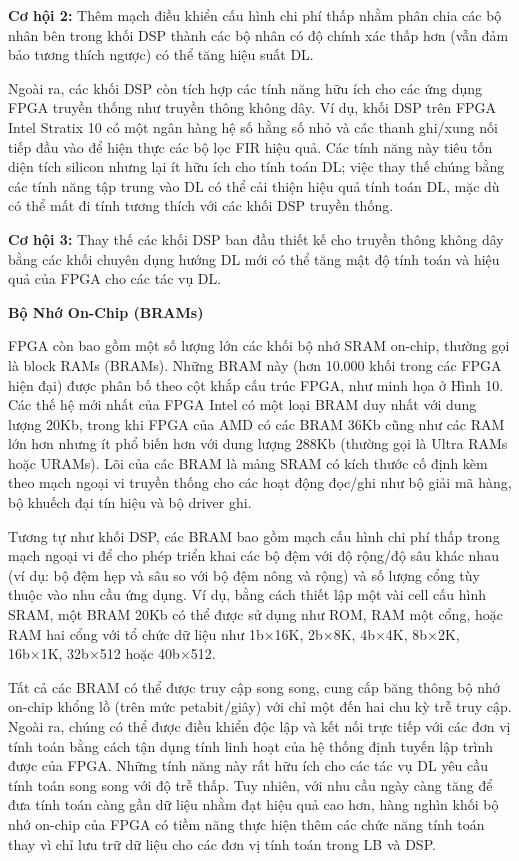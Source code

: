 \documentclass[a4paper]{article}
\begin{document}
\textbf{Cơ hội 2:} Thêm mạch điều khiển cấu hình chi phí thấp nhằm phân chia các bộ nhân bên trong khối DSP thành các bộ nhân có độ chính xác thấp hơn (vẫn đảm bảo tương thích ngược) có thể tăng hiệu suất DL.

Ngoài ra, các khối DSP còn tích hợp các tính năng hữu ích cho các ứng dụng FPGA truyền thống như truyền thông không dây. Ví dụ, khối DSP trên FPGA Intel Stratix 10 có một ngân hàng hệ số hằng số nhỏ và các thanh ghi/xung nối tiếp đầu vào để hiện thực các bộ lọc FIR hiệu quả. Các tính năng này tiêu tốn diện tích silicon nhưng lại ít hữu ích cho tính toán DL; việc thay thế chúng bằng các tính năng tập trung vào DL có thể cải thiện hiệu quả tính toán DL, mặc dù có thể mất đi tính tương thích với các khối DSP truyền thống.

\textbf{Cơ hội 3:} Thay thế các khối DSP ban đầu thiết kế cho truyền thông không dây bằng các khối chuyên dụng hướng DL mới có thể tăng mật độ tính toán và hiệu quả của FPGA cho các tác vụ DL.

\textbf{Bộ Nhớ On-Chip (BRAMs)}

FPGA còn bao gồm một số lượng lớn các khối bộ nhớ SRAM on-chip, thường gọi là block RAMs (BRAMs). Những BRAM này (hơn 10.000 khối trong các FPGA hiện đại) được phân bố theo cột khắp cấu trúc FPGA, như minh họa ở Hình 10. Các thế hệ mới nhất của FPGA Intel có một loại BRAM duy nhất với dung lượng 20Kb, trong khi FPGA của AMD có các BRAM 36Kb cũng như các RAM lớn hơn nhưng ít phổ biến hơn với dung lượng 288Kb (thường gọi là Ultra RAMs hoặc URAMs). Lõi của các BRAM là mảng SRAM có kích thước cố định kèm theo mạch ngoại vi truyền thống cho các hoạt động đọc/ghi như bộ giải mã hàng, bộ khuếch đại tín hiệu và bộ driver ghi.

Tương tự như khối DSP, các BRAM bao gồm mạch cấu hình chi phí thấp trong mạch ngoại vi để cho phép triển khai các bộ đệm với độ rộng/độ sâu khác nhau (ví dụ: bộ đệm hẹp và sâu so với bộ đệm nông và rộng) và số lượng cổng tùy thuộc vào nhu cầu ứng dụng. Ví dụ, bằng cách thiết lập một vài cell cấu hình SRAM, một BRAM 20Kb có thể được sử dụng như ROM, RAM một cổng, hoặc RAM hai cổng với tổ chức dữ liệu như 1b×16K, 2b×8K, 4b×4K, 8b×2K, 16b×1K, 32b×512 hoặc 40b×512.

Tất cả các BRAM có thể được truy cập song song, cung cấp băng thông bộ nhớ on-chip khổng lồ (trên mức petabit/giây) với chỉ một đến hai chu kỳ trễ truy cập. Ngoài ra, chúng có thể được điều khiển độc lập và kết nối trực tiếp với các đơn vị tính toán bằng cách tận dụng tính linh hoạt của hệ thống định tuyến lập trình được của FPGA. Những tính năng này rất hữu ích cho các tác vụ DL yêu cầu tính toán song song với độ trễ thấp. Tuy nhiên, với nhu cầu ngày càng tăng để đưa tính toán càng gần dữ liệu nhằm đạt hiệu quả cao hơn, hàng nghìn khối bộ nhớ on-chip của FPGA có tiềm năng thực hiện thêm các chức năng tính toán thay vì chỉ lưu trữ dữ liệu cho các đơn vị tính toán trong LB và DSP.
\end{document}
